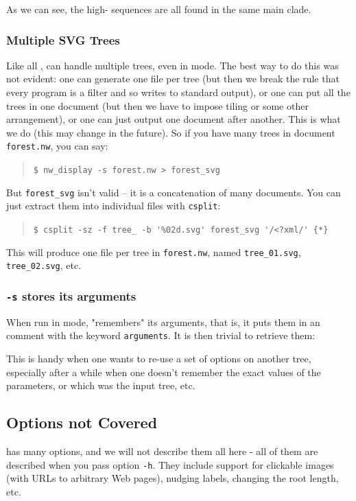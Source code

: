 \noindent{}As we can see, the high-\gc{} sequences are all found in the same
main clade.

\subsubsection{Multiple SVG Trees}

Like all \nutils, \display{} can handle multiple trees, even in \svg{} mode.
The best way to do this was not evident: one can generate one file per tree (but
then we break the rule that every program is a filter and so writes to standard
output), or one can put all the trees in one \svg{} document (but then we have
to impose tiling or some other arrangement), or one can just output one \svg{}
document after another. This is what we do (this may change in the future). So
if you have many trees in document \texttt{forest.nw}, you can say:
\begin{quote}
\verb+$ nw_display -s forest.nw > forest_svg+
\end{quote}
But \texttt{forest\_svg} isn't valid \svg{} -- it is a concatenation of many \svg{} documents. You can just extract them into individual files with \texttt{csplit}:
\begin{quote}
\verb+$ csplit -sz -f tree_ -b '%02d.svg' forest_svg '/<?xml/' {*}+
\end{quote}
This will produce one \svg{} file per tree in \texttt{forest.nw}, named \texttt{tree\_01.svg}, \texttt{tree\_02.svg}, etc.

\subsubsection{\display{} \texttt{-s} stores its arguments}

When run in \svg{} mode, \display{} "remembers" its arguments, that is, it puts
them in an \xml{} comment with the keyword \texttt{arguments}. It is then
trivial to retrieve them:




\noindent{}This is handy when one wants to re-use a set of options on another
tree, especially after a while when one doesn't remember the exact values of the
parameters, or which was the input tree, etc. 

\subsection{Options not Covered}

\display{} has many options, and we will not describe them all here - all of
them are described when you pass option \texttt{-h}. They include support for
clickable images (with URLs to arbitrary Web pages), nudging labels, changing
the root length, etc. 
